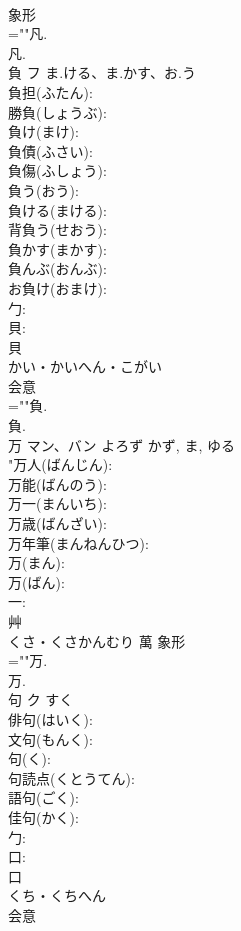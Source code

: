\documentclass[8pt]{extreport}
\begin{document}
\begin{CJK}{UTF8}{min}
\\	象形 
\\	=""凡.
\\	凡.
\\	負	フ	ま.ける、ま.かす、お.う		
\\	負担(ふたん): 
\\	勝負(しょうぶ): 
\\	負け(まけ): 
\\	負債(ふさい): 
\\	負傷(ふしょう): 
\\	負う(おう): 
\\	負ける(まける): 
\\	背負う(せおう): 
\\	負かす(まかす): 
\\	負んぶ(おんぶ): 
\\	お負け(おまけ): 
\\	勹: 
\\	貝: 
\\	貝	
\\	かい・かいへん・こがい	
\\	会意 
\\	=""負.
\\	負.
\\	万	マン、バン	よろず	かず, ま, ゆる	
\\	"万人(ばんじん): 
\\	万能(ばんのう): 
\\	万一(まんいち): 
\\	万歳(ばんざい): 
\\	万年筆(まんねんひつ): 
\\	万(まん): 
\\	万(ばん): 
\\	一: 
\\	艸	
\\	くさ・くさかんむり	萬	象形 
\\	=""万.
\\	万.
\\	句	ク		すく	
\\	俳句(はいく): 
\\	文句(もんく): 
\\	句(く): 
\\	句読点(くとうてん): 
\\	語句(ごく): 
\\	佳句(かく): 
\\	勹: 
\\	口: 
\\	口	
\\	くち・くちへん	
\\	会意 

\end{CJK}
\end{document}
